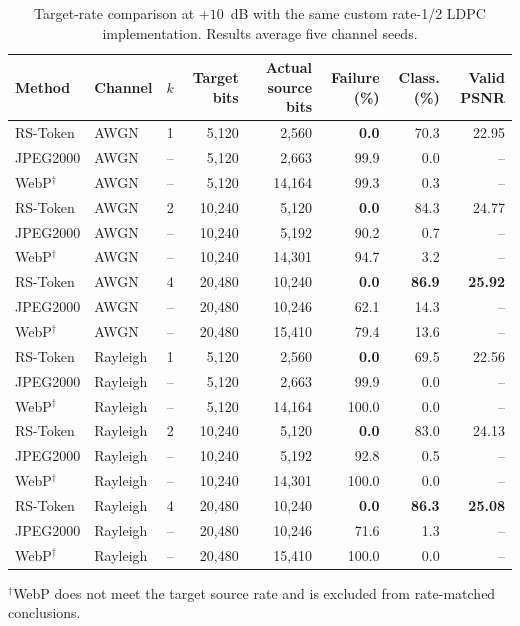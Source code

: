 \documentclass[letterpaper,journal]{IEEEtran}
\begin{document}
\begin{table}[!t]
\centering
\caption{Target-rate comparison at $+10$~dB with the same custom rate-1/2 LDPC implementation. Results average five channel seeds.}
\label{tab:ldpc}
\scriptsize
\setlength{\tabcolsep}{3.5pt}
\begin{tabular}{@{}llrrrrrr@{}}
\toprule
Method & Channel & $k$ & Target bits & Actual source bits & Failure (\%) & Class. (\%) & Valid PSNR \\ \midrule
RS-Token & AWGN & 1 & 5,120 & 2,560 & \textbf{0.0} & 70.3 & 22.95 \\
JPEG2000 & AWGN & -- & 5,120 & 2,663 & 99.9 & 0.0 & -- \\
WebP$^\dagger$ & AWGN & -- & 5,120 & 14,164 & 99.3 & 0.3 & -- \\
RS-Token & AWGN & 2 & 10,240 & 5,120 & \textbf{0.0} & 84.3 & 24.77 \\
JPEG2000 & AWGN & -- & 10,240 & 5,192 & 90.2 & 0.7 & -- \\
WebP$^\dagger$ & AWGN & -- & 10,240 & 14,301 & 94.7 & 3.2 & -- \\
RS-Token & AWGN & 4 & 20,480 & 10,240 & \textbf{0.0} & \textbf{86.9} & \textbf{25.92} \\
JPEG2000 & AWGN & -- & 20,480 & 10,246 & 62.1 & 14.3 & -- \\
WebP$^\dagger$ & AWGN & -- & 20,480 & 15,410 & 79.4 & 13.6 & -- \\ \midrule
RS-Token & Rayleigh & 1 & 5,120 & 2,560 & \textbf{0.0} & 69.5 & 22.56 \\
JPEG2000 & Rayleigh & -- & 5,120 & 2,663 & 99.9 & 0.0 & -- \\
WebP$^\dagger$ & Rayleigh & -- & 5,120 & 14,164 & 100.0 & 0.0 & -- \\
RS-Token & Rayleigh & 2 & 10,240 & 5,120 & \textbf{0.0} & 83.0 & 24.13 \\
JPEG2000 & Rayleigh & -- & 10,240 & 5,192 & 92.8 & 0.5 & -- \\
WebP$^\dagger$ & Rayleigh & -- & 10,240 & 14,301 & 100.0 & 0.0 & -- \\
RS-Token & Rayleigh & 4 & 20,480 & 10,240 & \textbf{0.0} & \textbf{86.3} & \textbf{25.08} \\
JPEG2000 & Rayleigh & -- & 20,480 & 10,246 & 71.6 & 1.3 & -- \\
WebP$^\dagger$ & Rayleigh & -- & 20,480 & 15,410 & 100.0 & 0.0 & -- \\ \bottomrule
\end{tabular}
\begin{flushleft}
$^\dagger$WebP does not meet the target source rate and is excluded from rate-matched conclusions.
\end{flushleft}
\end{table}
\end{document}
